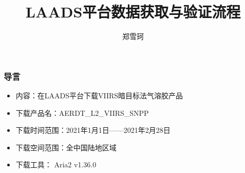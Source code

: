 \documentclass{ctexbeamer}
\title{LAADS平台数据获取与验证流程}
\author{郑雪珂}
\institute{lengfeng1453@hotmail.com}
\begin{document}
\frame{\titlepage}
\begin{frame}
  \frametitle{导言}
  \begin{itemize}
    \item 内容：在LAADS平台下载VIIRS暗目标法气溶胶产品
    \item 下载产品名：AERDT\_L2\_VIIRS\_SNPP
    \item 下载时间范围：2021年1月1日——2021年2月28日
    \item 下载空间范围：全中国陆地区域
    \item 下载工具： Aria2 v1.36.0
  \end{itemize}
\end{frame}



\end{document}
